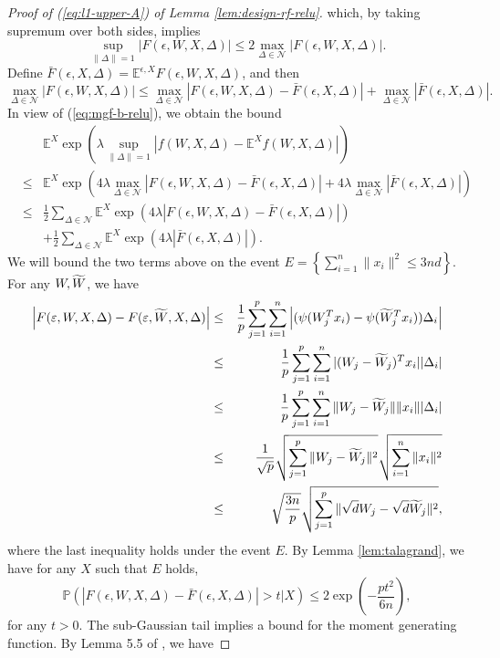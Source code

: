 \begin{proof}[Proof of (\ref{eq:l1-upper-A}) of Lemma \ref{lem:design-rf-relu}]
which, by taking supremum over both sides, implies
$$\sup_{\|\Delta\|=1}|F(\epsilon,W,X,\Delta)|\leq 2\max_{\Delta\in\mathcal{N}}|F(\epsilon,W,X,\Delta)|.$$
Define $\bar{F}(\epsilon,X,\Delta)=\mathbb{E}^{\epsilon,X}F(\epsilon,W,X,\Delta)$, and then
$$\max_{\Delta\in\mathcal{N}}|F(\epsilon,W,X,\Delta)|\leq \max_{\Delta\in\mathcal{N}}|F(\epsilon,W,X,\Delta)-\bar{F}(\epsilon,X,\Delta)|+\max_{\Delta\in\mathcal{N}}|\bar{F}(\epsilon,X,\Delta)|.$$
In view of (\ref{eq:mgf-b-relu}), we obtain the bound
\begin{eqnarray}
\nonumber && \mathbb{E}^X\exp\left(\lambda \sup_{\|\Delta\|=1}\left|f(W,X,\Delta)-\mathbb{E}^Xf(W,X,\Delta)\right|\right) \\
\nonumber &\leq& \mathbb{E}^X\exp\left(4\lambda \max_{\Delta\in\mathcal{N}}|F(\epsilon,W,X,\Delta)-\bar{F}(\epsilon,X,\Delta)|+4\lambda \max_{\Delta\in\mathcal{N}}|\bar{F}(\epsilon,X,\Delta)|\right) \\
\label{eq:tala-mgf1-relu} &\leq& \frac{1}{2}\sum_{\Delta\in\mathcal{N}} \mathbb{E}^{X}\exp\left(4\lambda|F(\epsilon,W,X,\Delta)-\bar{F}(\epsilon,X,\Delta)|\right) \\
\label{eq:tala-mgf2-relu} && + \frac{1}{2}\sum_{\Delta\in\mathcal{N}} \mathbb{E}^{X}\exp\left(4\lambda |\bar{F}(\epsilon,X,\Delta)|\right).
\end{eqnarray}
We will bound the two terms above on the event $E=\left\{\sum_{i=1}^n\|x_i\|^2\leq 3nd\right\}$. For any $W,\widetilde{W}$, we have
\begin{eqnarray*}
\left|F(\epsilon,W,X,\Delta)-F(\epsilon,\wt{W},X,\Delta)\right| &\leq& \frac{1}{p}\sum_{j=1}^p\sum_{i=1}^n\left|({\psi}(W_j^Tx_i)-{\psi}(\wt{W}_j^Tx_i))\Delta_i\right| \\
&\leq& \frac{1}{p}\sum_{j=1}^p\sum_{i=1}^n|(W_j-\wt{W}_j)^Tx_i||\Delta_i| \\
&\leq& \frac{1}{p}\sum_{j=1}^p\sum_{i=1}^n\|W_j-\wt{W}_j\|\|x_i\||\Delta_i| \\
&\leq& \frac{1}{\sqrt{p}}\sqrt{\sum_{j=1}^p\|W_j-\wt{W}_j\|^2}\sqrt{\sum_{i=1}^n\|x_i\|^2} \\
&\leq& \sqrt{\frac{3n}{p}}\sqrt{\sum_{j=1}^p\|\sqrt{d}W_j-\sqrt{d}\wt{W}_j\|^2},
\end{eqnarray*}
where the last inequality holds under the event $E$. By Lemma \ref{lem:talagrand}, we have for any $X$ such that $E$ holds,
$$\mathbb{P}\left(|F(\epsilon,W,X,\Delta)-\bar{F}(\epsilon,X,\Delta)|>t\big|X\right)\leq 2\exp\left(-\frac{pt^2}{6n}\right),$$
for any $t>0$. The sub-Gaussian tail implies a bound for the moment generating function. By Lemma 5.5 of \cite{vershynin2010introduction}, we have

\end{proof}
